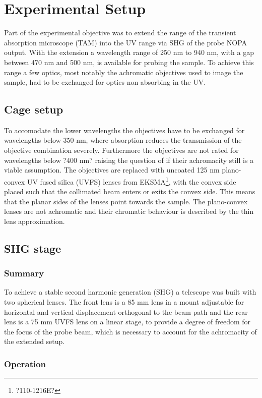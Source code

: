 \documentclass[10pt,a4paper]{article}
\begin{document}
\section{Experimental Setup}
Part of the experimental objective was to extend the range of the transient absorption microscope (TAM) into the UV range via SHG of the probe NOPA output. With the extension a wavelength range of 250 nm to 940 nm, with a gap between 470 nm and 500 nm, is available for probing the sample.\newline
To achieve this range a few optics, most notably the achromatic objectives used to image the sample, had to be exchanged for optics non absorbing in the UV.
\subsection{Cage setup}
To accomodate the lower wavelengths the objectives have to be exchanged for wavelengths below 350 nm, where absorption reduces the transmission of the objective combination severely. Furthermore the objectives are not rated for wavelengths below ?400 nm? raising the question of if their achromacity still is a viable assumption.\newline
The objectives are replaced with  uncoated 125 nm plano-convex UV fused silica (UVFS) lenses from EKSMA\footnote{?110-1216E?}, with the convex side placed such that the collimated beam enters or exits the convex side. This means that the planar sides of the lenses point towards the sample.\newline
The plano-convex lenses are not achromatic and their chromatic behaviour is described by the thin lens approximation.
\subsection{SHG stage}
\subsubsection{Summary}
To achieve a stable second harmonic generation (SHG) a telescope was built with two spherical lenses. The front lens is a 85 mm lens in a mount adjustable for horizontal and vertical displacement orthogonal to the beam path and the rear lens is a 75 mm UVFS lens on a linear stage, to provide a degree of freedom for the focus of the probe beam, which is necessary to account for the achromacity of the extended setup.
\subsubsection{Operation}
\end{document}
